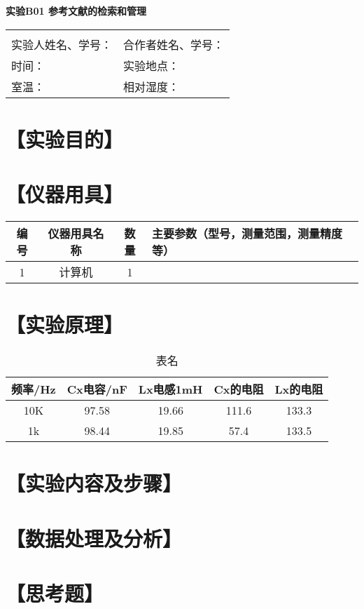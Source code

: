 \documentclass[12pt,a4paper]{article}
\begin{document}

\begin{center}
\LARGE\textbf{实验B01 参考文献的检索和管理}
\end{center}

\begin{doublespacing}
	\centering
	\begin{tabular}{p{6.5cm}p{6.5cm}}
	 & \\
	 实验人姓名、学号： & 合作者姓名、学号：\\
	 {时间：} & {实验地点：}\\
	 {室温：} & 相对湿度：
	
	\end{tabular}
\end{doublespacing}



\section*{【实验目的】}


\section*{【仪器用具】}

	\begin{table}[htbp]
	  \centering
	    \begin{tabular}{cccp{20em}}
	    \toprule
	    编号    & 仪器用具名称 & 数量    & 主要参数（型号，测量范围，测量精度等） \\
	    \midrule
	    1     & 计算机 & 1     &  \\
	    \bottomrule
	    \end{tabular}%
	  \label{tab:device}%
	\end{table}%

\section*{【实验原理】}

\begin{table}[htbp]
	\centering
		\caption{表名}
		\vspace{1em} %
		{
		\begin{tabular}{ccccc}
		\toprule
		频率/Hz &  Cx电容/nF &  Lx电感1mH & Cx的电阻 & Lx的电阻 \\
		\midrule
		10K & 97.58 & 19.66 & 111.6 & 133.3 \\
		1k & 98.44 & 19.85 & 57.4 & 133.5 \\
		\bottomrule
		\end{tabular}
		}
		\label{tab:data}
\end{table}

\section*{【实验内容及步骤】}



\section*{【数据处理及分析】}


\section*{【思考题】}

	
\end{document}
